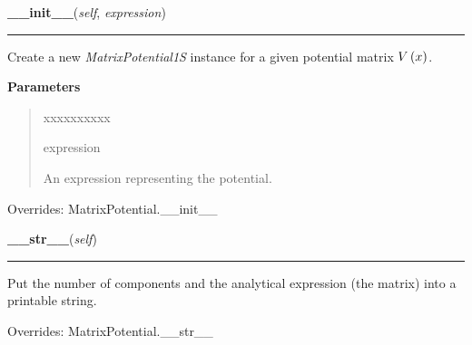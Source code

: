 \hspace{.8\funcindent}\begin{boxedminipage}{\funcwidth}

    \raggedright \textbf{\_\_init\_\_}(\textit{self}, \textit{expression})

    \vspace{-1.5ex}

    \rule{\textwidth}{0.5\fboxrule}
\setlength{\parskip}{2ex}
    Create a new \textit{MatrixPotential1S} instance for a given potential
    matrix $V\left( x \right)$.

\setlength{\parskip}{1ex}
      \textbf{Parameters}
      \vspace{-1ex}

      \begin{quote}
        \begin{Ventry}{xxxxxxxxxx}

          \item[expression]

          An expression representing the potential.

        \end{Ventry}

      \end{quote}

      Overrides: MatrixPotential.\_\_init\_\_

    \end{boxedminipage}

    \vspace{0.5ex}

\hspace{.8\funcindent}\begin{boxedminipage}{\funcwidth}

    \raggedright \textbf{\_\_str\_\_}(\textit{self})

    \vspace{-1.5ex}

    \rule{\textwidth}{0.5\fboxrule}
\setlength{\parskip}{2ex}
    Put the number of components and the analytical expression (the matrix)
    into a printable string.

\setlength{\parskip}{1ex}

      Overrides: MatrixPotential.\_\_str\_\_

    \end{boxedminipage}

    \vspace{0.5ex}

